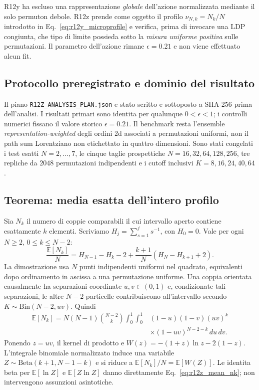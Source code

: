 \documentclass[11pt,a4paper]{article}
\begin{document}
R12y ha escluso una rappresentazione \emph{globale} dell'azione normalizzata mediante il solo permuton debole. R12z prende come oggetto il profilo $\nu_{N,k}=N_k/N$ introdotto in Eq.~\eqref{eq:r12y_microprofile} e verifica, prima di invocare una LDP congiunta, che tipo di limite possieda sotto la \emph{misura uniforme positiva} sulle permutazioni. Il parametro dell'azione rimane $\epsilon=0.21$ e non viene effettuato alcun fit.

\subsection{Protocollo preregistrato e dominio del risultato}

Il piano \texttt{R12Z\_ANALYSIS\_PLAN.json} e stato scritto e sottoposto a SHA-256 prima dell'analisi. I risultati primari sono identita per qualunque $0<\epsilon<1$; i controlli numerici fissano il valore storico $\epsilon=0.21$. Il benchmark resta l'ensemble \emph{representation-weighted} degli ordini 2d associati a permutazioni uniformi, non il path sum Lorentziano non etichettato in quattro dimensioni. Sono stati congelati i test esatti $N=2,\ldots,7$, le cinque taglie prospettiche $N=16,32,64,128,256$, tre repliche da $2048$ permutazioni indipendenti e i cutoff inclusivi $K=8,16,24,40,64$.

\subsection{Teorema: media esatta dell'intero profilo}

Sia $N_k$ il numero di coppie comparabili il cui intervallo aperto contiene esattamente $k$ elementi. Scriviamo $H_j=\sum_{s=1}^j s^{-1}$, con $H_0=0$. Vale per ogni $N\ge2$, $0\le k\le N-2$:
\begin{equation}
\boxed{\frac{\mathbb E[N_k]}{N}=H_{N-1}-H_k-2+\frac{k+1}{N}\left(H_N-H_{k+1}+2\right).}\label{eq:r12z_mean_nk}
\end{equation}
La dimostrazione usa $N$ punti indipendenti uniformi nel quadrato, equivalenti dopo ordinamento in ascissa a una permutazione uniforme. Una coppia orientata causalmente ha separazioni coordinate $u,v\in(0,1)$ e, condizionate tali separazioni, le altre $N-2$ particelle contribuiscono all'intervallo secondo $K\sim\mathrm{Bin}(N-2,uv)$. Quindi
\begin{align}
\mathbb E[N_k]=N(N-1)\binom{N-2}{k}\int_0^1\!\int_0^1
 &(1-u)(1-v)(uv)^k\\
 &\times(1-uv)^{N-2-k}\,du\,dv.\label{eq:r12z_pair_integral}
\end{align}
Ponendo $z=uv$, il kernel di prodotto e $W(z)=-(1+z)\ln z-2(1-z)$. L'integrale binomiale normalizzato induce una variabile $Z\sim\mathrm{Beta}(k+1,N-1-k)$ e si riduce a $\mathbb E[N_k]/N=\mathbb E[W(Z)]$. Le identita beta per $\mathbb E[\ln Z]$ e $\mathbb E[Z\ln Z]$ danno direttamente Eq.~\eqref{eq:r12z_mean_nk}; non intervengono assunzioni asintotiche.
\end{document}
